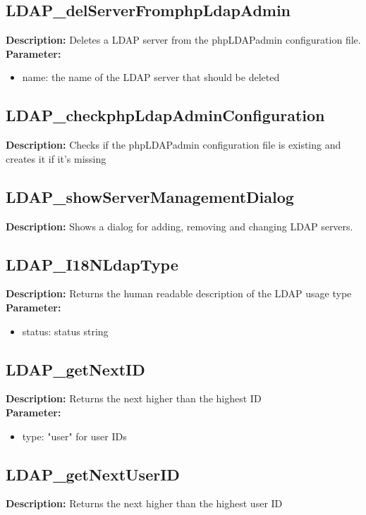 \subsection{LDAP\_delServerFromphpLdapAdmin}
\textbf{Description:} Deletes a LDAP server from the phpLDAPadmin configuration file.\\
\textbf{Parameter:}
\begin{itemize}
\item name: the name of the LDAP server that should be deleted
\end{itemize}

\subsection{LDAP\_checkphpLdapAdminConfiguration}
\textbf{Description:} Checks if the phpLDAPadmin configuration file is existing and creates it if it's missing\\

\subsection{LDAP\_showServerManagementDialog}
\textbf{Description:} Shows a dialog for adding, removing and changing LDAP servers.\\

\subsection{LDAP\_I18NLdapType}
\textbf{Description:} Returns the human readable description of the LDAP usage type \\
\textbf{Parameter:}
\begin{itemize}
\item status: status string
\end{itemize}

\subsection{LDAP\_getNextID}
\textbf{Description:} Returns the next higher than the highest ID\\
\textbf{Parameter:}
\begin{itemize}
\item type: "user" for user IDs
\end{itemize}

\subsection{LDAP\_getNextUserID}
\textbf{Description:} Returns the next higher than the highest user ID\\

